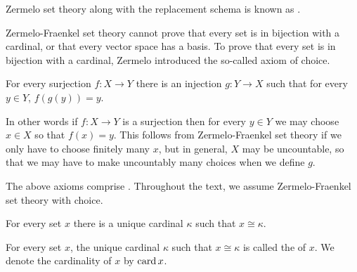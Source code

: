 Zermelo set theory along with the replacement schema is known as .

Zermelo-Fraenkel set theory cannot prove that every set is in bijection with a cardinal, or that every vector space has a basis.
To prove that every set is in bijection with a cardinal, Zermelo introduced the so-called axiom of choice.

\begin{axiom}[choice]
\label{axiom of choice}
For every surjection $f: X \to Y$ there is an injection $g: Y \to X$ such that for every $y \in Y$, $f(g(y)) = y$.
\end{axiom}
In other words if $f: X \to Y$ is a surjection then for every $y \in Y$ we may choose $x \in X$ so that $f(x) = y$.
This follows from Zermelo-Fraenkel set theory if we only have to choose finitely many $x$, but in general, $X$ may be uncountable, so that we may have to make uncountably many choices when we define $g$.

The above axioms comprise .
Throughout the text, we assume Zermelo-Fraenkel set theory with choice.

\begin{theorem}
\label{well-ordering theorem}
For every set $x$ there is a unique cardinal $\kappa$ such that $x \cong \kappa$.
\end{theorem}

\begin{definition}
For every set $x$, the unique cardinal $\kappa$ such that $x \cong \kappa$ is called the  of $x$.
We denote the cardinality of $x$ by $\operatorname{card} x$.
\end{definition}

